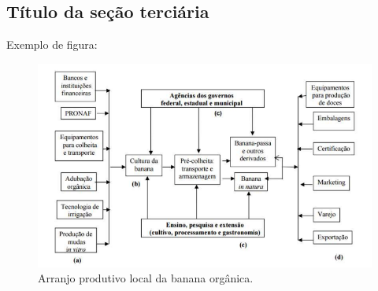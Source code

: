 \subsection{Título da seção terciária}

Exemplo de figura:

\begin{figure}[H]
	\caption{\label{fig_arranjo}Arranjo produtivo local da banana orgânica.}
	\begin{center}
	    \includegraphics[scale=1.0]{imagens/fig_exemplo.png}
	\end{center}
\end{figure}

